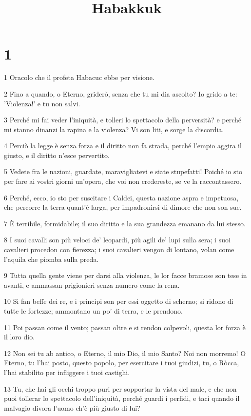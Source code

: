 

\title{Habakkuk}


\chapter{1}

\par 1 Oracolo che il profeta Habacuc ebbe per visione.
\par 2 Fino a quando, o Eterno, griderò, senza che tu mi dia ascolto? Io grido a te: 'Violenza!' e tu non salvi.
\par 3 Perché mi fai veder l'iniquità, e tolleri lo spettacolo della perversità? e perché mi stanno dinanzi la rapina e la violenza? Vi son liti, e sorge la discordia.
\par 4 Perciò la legge è senza forza e il diritto non fa strada, perché l'empio aggira il giusto, e il diritto n'esce pervertito.
\par 5 Vedete fra le nazioni, guardate, maravigliatevi e siate stupefatti! Poiché io sto per fare ai vostri giorni un'opera, che voi non credereste, se ve la raccontassero.
\par 6 Perché, ecco, io sto per suscitare i Caldei, questa nazione aspra e impetuosa, che percorre la terra quant'è larga, per impadronirsi di dimore che non son sue.
\par 7 È terribile, formidabile; il suo diritto e la sua grandezza emanano da lui stesso.
\par 8 I suoi cavalli son più veloci de' leopardi, più agili de' lupi sulla sera; i suoi cavalieri procedon con fierezza; i suoi cavalieri vengon di lontano, volan come l'aquila che piomba sulla preda.
\par 9 Tutta quella gente viene per darsi alla violenza, le lor facce bramose son tese in avanti, e ammassan prigionieri senza numero come la rena.
\par 10 Si fan beffe dei re, e i principi son per essi oggetto di scherno; si ridono di tutte le fortezze; ammontano un po' di terra, e le prendono.
\par 11 Poi passan come il vento; passan oltre e si rendon colpevoli, questa lor forza è il loro dio.
\par 12 Non sei tu ab antico, o Eterno, il mio Dio, il mio Santo? Noi non morremo! O Eterno, tu l'hai posto, questo popolo, per esercitare i tuoi giudizi, tu, o Ròcca, l'hai stabilito per infliggere i tuoi castighi.
\par 13 Tu, che hai gli occhi troppo puri per sopportar la vista del male, e che non puoi tollerar lo spettacolo dell'iniquità, perché guardi i perfidi, e taci quando il malvagio divora l'uomo ch'è più giusto di lui?
